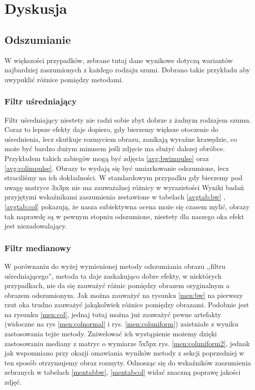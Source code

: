 \documentclass{classrep}
\begin{document}
\section{Dyskusja}

\subsection{Odszumianie}

W większości przypadków, zebrane tutaj dane wynikowe dotyczą wariantów najbardziej zaszumionych z każdego rodzaju szumi. Dobrano takie przykładu aby uwypuklić różnice pomiędzy metodami.

\subsubsection{Filtr uśredniający}

Filtr uśredniający niestety nie radzi sobie zbyt dobrze z żadnym rodzajem szumu. Coraz to lepsze efekty daje dopiero, gdy bierzemy większe otoczenie do uśrednienia, lecz skutkuje rozmyciem obrazu, zanikają wyraźne krawędzie, co może być bardzo dużym minusem jeśli zdjęcie ma służyć dalszej obróbce. Przykładem takich zabiegów mogą być zdjęcia \ref{avg:bwimpulse} oraz \ref{avg:colimpulse}. Obrazy te wydają się być umiarkowanie odszumione, lecz straciliśmy na ich dokładności. W standardowym przypadku gdy bierzemy pod uwagę matryce 3x3px nie ma zauważalnej różnicy w wyrazistości  Wyniki badań  przyjętymi wskaźnikami zaszumienia zestawione w tabelach \ref{avgtab:bw} , \ref{avgtab:col} pokazują, że nasza subiektywna ocena może się czasem mylić, obrazy tak naprawdę są w pewnym stopniu odszumione, niestety dla naszego oka efekt jest niezadowalający.

\subsubsection{Filtr medianowy}

W porównaniu do wyżej wymienionej metody odszumiania obrazu ,,filtru uśredniającego'', metoda ta daje zaskakująco dobre efekty, w niektórych przypadkach, nie da się zauważyć różnic pomiędzy obrazem oryginalnym a obrazem odszumionym. Jak można zauważyć 
na rysunku \ref{men:bw} na pierwszy rzut oka trudno zauważyć jakąkolwiek różnice pomiędzy obrazami. Podobnie jest na rysunku \ref{men:col}, jednaj tutaj można już zauważyć pewne artefakty (widoczne na rys \ref{men:colnormal} i rys. \ref{men:coluniform}) zaistniałe z wyniku zastosowania tejże metody. Zniwelować ich wystąpienie możemy dzięki zastosowaniu mediany z matryc o wymiarze 5x5px rys. \ref{men:coluniform2}, jednak jak wspomniano przy okazji omawiania wyników metody z sekcji poprzedniej w ten sposób otrzymujemy obraz rozmyty. Odnosząc się do wskaźników zaszumienia zebranych w tabelach \ref{mentabbw}, \ref{mentabcol} widać znaczną poprawę jakości zdjęć.
\end{document}
